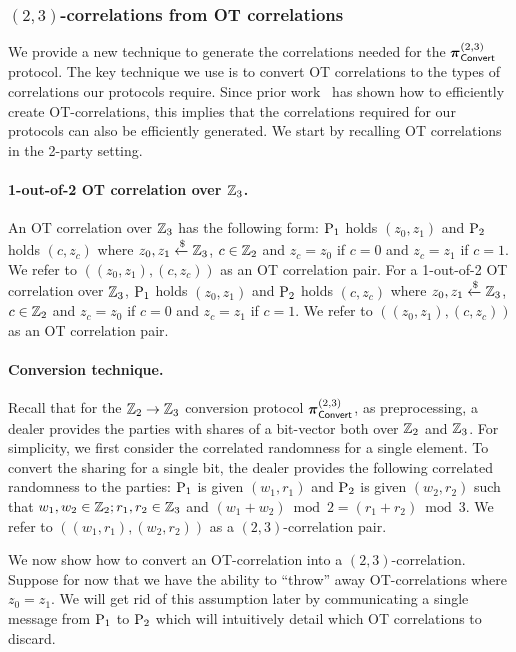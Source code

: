 \subsubsection{$(2,3)$-correlations from OT correlations}
We provide a new technique to generate the correlations needed for the $\boldsymbol{\pi}_{\textnormal{\textsf{Convert}}}^{(2,3)}$ protocol. The key technique we use is to convert OT correlations to the types of correlations our protocols require. Since prior work~\cite{boyle2019-pcg,yang2020-ferret} has shown how to efficiently create OT-correlations, this implies that the correlations required for our protocols can also be efficiently generated.  
\iffull
We start by recalling OT correlations in the 2-party setting.
\paragraph{1-out-of-2 OT correlation over $\mathbb{Z}_3$.} An OT correlation over $\mathbb{Z}_3$ has the following form: $\textnormal{P}_1$ holds $(z_0, z_1)$ and $\textnormal{P}_2$ holds $(c, z_c)$ where $z_0, z_1 \xleftarrow{\$} \mathbb{Z}_3$, $c \in \mathbb{Z}_2$ and $z_c = z_0$ if $c=0$ and $z_c = z_1$ if $c=1$. We refer to $((z_0,z_1), (c, z_c))$ as an OT correlation pair.
\else
For a 1-out-of-2 OT correlation over $\mathbb{Z}_3$, $\textnormal{P}_1$ holds $(z_0, z_1)$ and $\textnormal{P}_2$ holds $(c, z_c)$ where $z_0, z_1 \xleftarrow{\$} \mathbb{Z}_3$, $c \in \mathbb{Z}_2$ and $z_c = z_0$ if $c=0$ and $z_c = z_1$ if $c=1$. We refer to $((z_0,z_1), (c, z_c))$ as an OT correlation pair.
\fi

\paragraph{Conversion technique.}
Recall that for the $\mathbb{Z}_2 \to \mathbb{Z}_3$ conversion protocol $\boldsymbol{\pi}_{\textnormal{\textsf{Convert}}}^{(2,3)}$, as preprocessing, a dealer provides the parties with shares of a bit-vector both over $\mathbb{Z}_2$ and $\mathbb{Z}_3$. For simplicity, we first consider the correlated randomness for a single element. To convert the sharing for a single bit, the dealer provides the following correlated randomness to the parties: $\textnormal{P}_1$ is given $(w_1, r_1)$ and $\textnormal{P}_2$ is given $(w_2, r_2)$ such that $w_1, w_2 \in \mathbb{Z}_2; r_1, r_2 \in \mathbb{Z}_3$ and $(w_1 + w_2) \bmod 2 = (r_1 + r_2) \bmod 3$. We refer to $((w_1, r_1), (w_2, r_2))$ as a $(2,3)$-correlation pair.

We now show how to convert an OT-correlation into a $(2,3)$-correlation. Suppose for now that we have the ability to ``throw'' away OT-correlations where $z_0 = z_1$. We will get rid of this assumption later by communicating a single message from $\textnormal{P}_1$ to $\textnormal{P}_2$ which will intuitively detail which OT correlations to discard.

